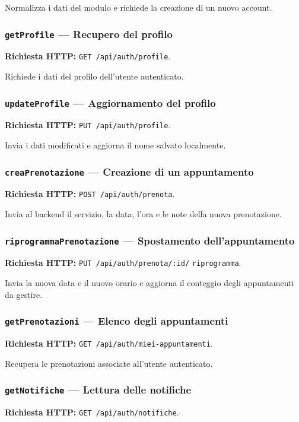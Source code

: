 \documentclass[12pt,a4paper]{article}
\begin{document}
Normalizza i dati del modulo e richiede la creazione di un nuovo account.

\subsubsection{\texttt{getProfile} --- Recupero del profilo}
\textbf{Richiesta HTTP:} \texttt{GET /api/auth/profile}.

Richiede i dati del profilo dell'utente autenticato.

\subsubsection{\texttt{updateProfile} --- Aggiornamento del profilo}
\textbf{Richiesta HTTP:} \texttt{PUT /api/auth/profile}.

Invia i dati modificati e aggiorna il nome salvato localmente.

\subsubsection{\texttt{creaPrenotazione} --- Creazione di un appuntamento}
\textbf{Richiesta HTTP:} \texttt{POST /api/auth/prenota}.

Invia al backend il servizio, la data, l'ora e le note della nuova prenotazione.

\subsubsection{\texttt{riprogrammaPrenotazione} --- Spostamento dell'appuntamento}
\textbf{Richiesta HTTP:} \texttt{PUT /api/auth/prenota/:id/}\allowbreak
\texttt{riprogramma}.

Invia la nuova data e il nuovo orario e aggiorna il conteggio degli
appuntamenti da gestire.

\subsubsection{\texttt{getPrenotazioni} --- Elenco degli appuntamenti}
\textbf{Richiesta HTTP:} \texttt{GET /api/auth/miei-appuntamenti}.

Recupera le prenotazioni associate all'utente autenticato.

\subsubsection{\texttt{getNotifiche} --- Lettura delle notifiche}
\textbf{Richiesta HTTP:} \texttt{GET /api/auth/notifiche}.
\end{document}
